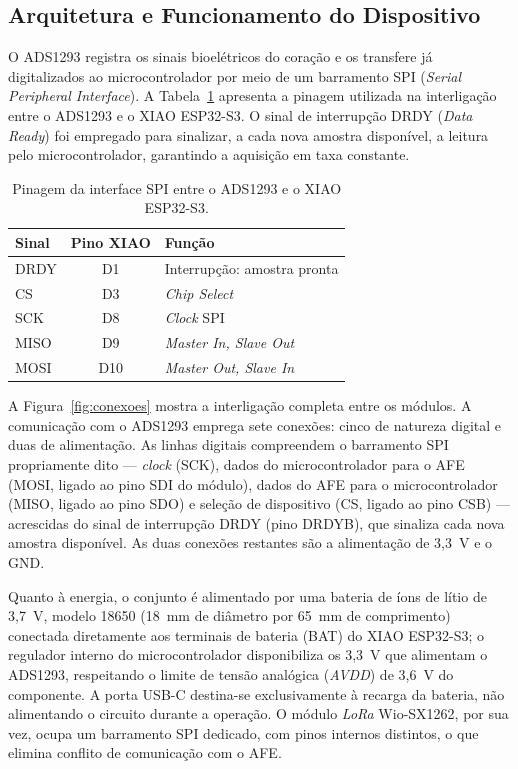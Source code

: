 \subsection{Arquitetura e Funcionamento do Dispositivo}
\label{sec:arqDispositivo}

O ADS1293 registra os sinais bioelétricos do coração e os transfere já digitalizados ao microcontrolador por meio de um barramento \acs{SPI} (\textit{Serial Peripheral Interface}). A Tabela~\ref{tab:pinagem} apresenta a pinagem utilizada na interligação entre o ADS1293 e o XIAO ESP32-S3. O sinal de interrupção \acs{DRDY} (\textit{Data Ready}) foi empregado para sinalizar, a cada nova amostra disponível, a leitura pelo microcontrolador, garantindo a aquisição em taxa constante.

\begin{table}[h]
    \centering
    \caption{Pinagem da interface \acs{SPI} entre o ADS1293 e o XIAO ESP32-S3.}
    \begin{tabular}{l|c|l}
        \textbf{Sinal} & \textbf{Pino XIAO} & \textbf{Função} \\ \hline
        DRDY & D1 & Interrupção: amostra pronta \\ \hline
        CS   & D3 & \textit{Chip Select} \\ \hline
        SCK  & D8 & \textit{Clock} \acs{SPI} \\ \hline
        MISO & D9 & \textit{Master In, Slave Out} \\ \hline
        MOSI & D10 & \textit{Master Out, Slave In} \\ \hline
    \end{tabular}
    \label{tab:pinagem}
\end{table}

A Figura~\ref{fig:conexoes} mostra a interligação completa entre os módulos. A comunicação com o ADS1293 emprega sete conexões: cinco de natureza digital e duas de alimentação. As linhas digitais compreendem o barramento \acs{SPI} propriamente dito — \textit{clock} (SCK), dados do microcontrolador para o \acs{AFE} (MOSI, ligado ao pino SDI do módulo), dados do \acs{AFE} para o microcontrolador (MISO, ligado ao pino SDO) e seleção de dispositivo (CS, ligado ao pino CSB) — acrescidas do sinal de interrupção \acs{DRDY} (pino DRDYB), que sinaliza cada nova amostra disponível. As duas conexões restantes são a alimentação de 3,3~V e o GND.

Quanto à energia, o conjunto é alimentado por uma bateria de íons de lítio de 3,7~V, modelo 18650 (18~mm de diâmetro por 65~mm de comprimento) conectada diretamente aos terminais de bateria (BAT) do XIAO ESP32-S3; o regulador interno do microcontrolador disponibiliza os 3,3~V que alimentam o ADS1293, respeitando o limite de tensão analógica (\textit{AVDD}) de 3,6~V do componente. A porta USB-C destina-se exclusivamente à recarga da bateria, não alimentando o circuito durante a operação. O módulo \textit{LoRa} Wio-SX1262, por sua vez, ocupa um barramento \acs{SPI} dedicado, com pinos internos distintos, o que elimina conflito de comunicação com o \acs{AFE}.

